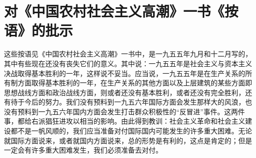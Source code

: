 \section[对《中国农村社会主义高潮》一书《按语》的批示（一九五八年三月十九日）]{对《中国农村社会主义高潮》一书《按语》的批示}


这些按语见《中国农村社会主义高潮》一书中，是一九五五年九月和十二月写的，其中有些现在还没有丧失它们的意义。其中说：一九五五年是社会主义与资本主义决战取得基本胜利的一年，这样说不妥当。应当说，一九五五年是在生产关系的所有制方面取得基本胜利的一年，在生产关系的其他方面以及上层建筑的某些方面即思想战线方面和政治战线方面，则或者还没有基本胜利，或者还没有完全胜利，还有待于今后的努力。我们没有预料到一九五六年国际方面会发生那样大的风浪，也没有预料到一九五六年国内方面会发生打击群众积极性的“反冒进”事件。这两件事，都给右派猖狂进攻以相当的影响。由此得到教训：社会主义革命和社会主义建设都不是一帆风顺的，我们应当准备对付国际国内可能发生的许多重大困难。无论就国际方面说来，或者就国内方面说来，总的形势是有利的，这点是肯定的；但是一定会有许多重大困难发生，我们必须准备去对付。

